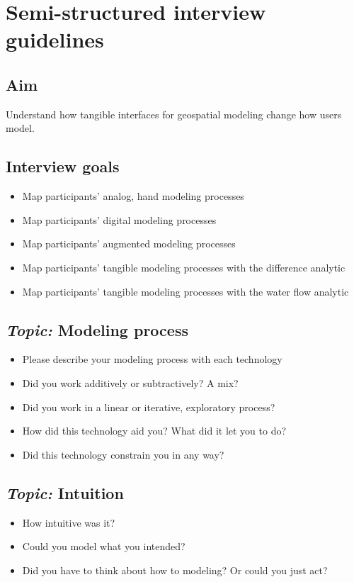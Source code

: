\documentclass[prodmode,acmtochi]{acmsmall} %
\begin{document}
\vfill
\clearpage

\section{Semi-structured interview guidelines}\label{appendix:guidelines}
\vspace*{0.5em}

\subsection{Aim}
Understand how tangible interfaces for geospatial modeling change how users model.
\vspace*{0.5em}

\subsection{Interview goals}
\begin{itemize}
\item Map participants' analog, hand modeling processes
\item Map participants' digital modeling processes
\item Map participants' augmented modeling processes
\item Map participants' tangible modeling processes with the difference analytic
\item Map participants' tangible modeling processes with the water flow analytic
\end{itemize}
\vspace*{0.5em}

\subsection{\emph{Topic:} Modeling process}
\begin{itemize}
\item Please describe your modeling process with each technology
\item Did you work additively or subtractively? A mix?
\item Did you work in a linear or iterative, exploratory process?
\item How did this technology aid you? What did it let you to do?
\item Did this technology constrain you in any way?
\end{itemize}
\vspace*{0.5em}

\subsection{\emph{Topic:} Intuition}
\begin{itemize}
\item How intuitive was it? 
\item Could you model what you intended?
\item Did you have to think about how to modeling? Or could you just act?
\end{itemize}
\vspace*{0.5em}
\end{document}
